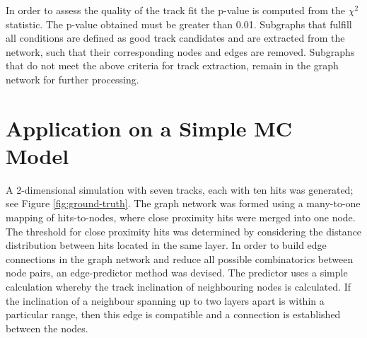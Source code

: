 In order to assess the quality of the track fit the p-value is computed from the $\chi^2$ statistic. The p-value obtained must be greater than 0.01. Subgraphs that fulfill all conditions are defined as good track candidates and are extracted from the network, such that their corresponding nodes and edges are removed. Subgraphs that do not meet the above criteria for track extraction, remain in the graph network for further processing.





\section{Application on a Simple MC Model}
\label{gnn-application-toy-model}




A 2-dimensional simulation with seven tracks, each with ten hits was generated; see Figure \ref{fig:ground-truth}. The graph network was formed using a many-to-one mapping of hits-to-nodes, where close proximity hits were merged into one node. The threshold for close proximity hits was determined by considering the distance distribution between hits located in the same layer. In order to build edge connections in the graph network and reduce all possible combinatorics between node pairs, an edge-predictor method was devised. The predictor uses a simple calculation whereby the track inclination of neighbouring nodes is calculated. If the inclination of a neighbour spanning up to two layers apart is within a particular range, then this edge is compatible and a connection is established between the nodes. 

